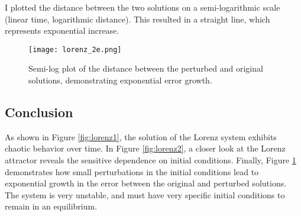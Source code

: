 \documentclass[12pt]{article}
\begin{document}
I plotted the distance between the two solutions on a semi-logarithmic scale (linear time, logarithmic distance). This resulted in a straight line, which represents exponential increase.

\begin{figure}[h!]
\centering
\texttt{[image: lorenz\_2e.png]}
\caption{Semi-log plot of the distance between the perturbed and original solutions, demonstrating exponential error growth.}
\label{fig:distance}
\end{figure}

\subsection*{Conclusion}

As shown in Figure \ref{fig:lorenz1}, the solution of the Lorenz system exhibits chaotic behavior over time. In Figure \ref{fig:lorenz2}, a closer look at the Lorenz attractor reveals the sensitive dependence on initial conditions. Finally, Figure \ref{fig:distance} demonstrates how small perturbations in the initial conditions lead to exponential growth in the error between the original and perturbed solutions. The system is very unstable, and must have very specific initial conditions to remain in an equilibrium.
\end{document}
